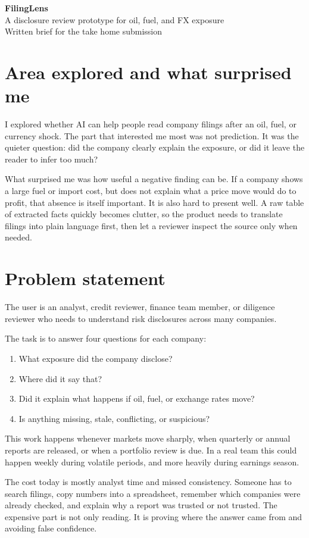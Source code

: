 \documentclass[10pt]{article}
\begin{document}
{\Huge \bfseries FilingLens}\\[-1pt]
{\large A disclosure review prototype for oil, fuel, and FX exposure}\\[4pt]
{\color{muted}Written brief for the take home submission}

\section{Area explored and what surprised me}

I explored whether AI can help people read company filings after an oil, fuel, or currency shock. The part that interested me most was not prediction. It was the quieter question: did the company clearly explain the exposure, or did it leave the reader to infer too much?

What surprised me was how useful a negative finding can be. If a company shows a large fuel or import cost, but does not explain what a price move would do to profit, that absence is itself important. It is also hard to present well. A raw table of extracted facts quickly becomes clutter, so the product needs to translate filings into plain language first, then let a reviewer inspect the source only when needed.

\section{Problem statement}

The user is an analyst, credit reviewer, finance team member, or diligence reviewer who needs to understand risk disclosures across many companies.

The task is to answer four questions for each company:
\begin{enumerate}
  \item What exposure did the company disclose?
  \item Where did it say that?
  \item Did it explain what happens if oil, fuel, or exchange rates move?
  \item Is anything missing, stale, conflicting, or suspicious?
\end{enumerate}

This work happens whenever markets move sharply, when quarterly or annual reports are released, or when a portfolio review is due. In a real team this could happen weekly during volatile periods, and more heavily during earnings season.

The cost today is mostly analyst time and missed consistency. Someone has to search filings, copy numbers into a spreadsheet, remember which companies were already checked, and explain why a report was trusted or not trusted. The expensive part is not only reading. It is proving where the answer came from and avoiding false confidence.
\end{document}
